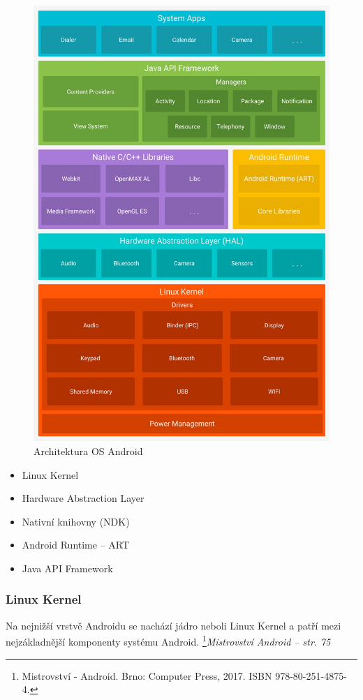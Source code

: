 \documentclass{vskpou} %
\begin{document}
\begin{figure}[h!]
\centering
\includegraphics[scale=0.5]{images/2.jpg}
\caption{Architektura OS Android}
\label{1}
\end{figure}

\begin{itemize}
    \item Linux Kernel
    \item Hardware Abstraction Layer
    \item Nativní knihovny (NDK)
    \item Android Runtime – ART
    \item Java API Framework
\end{itemize}
\newpage
\subsubsection{Linux Kernel}
Na nejnižší vrstvě Androidu se nachází jádro neboli Linux Kernel a patří mezi nejzákladnější komponenty systému Android. \footnote{Mistrovství - Android. Brno: Computer Press, 2017. ISBN 978-80-251-4875-4.}\textit{Mistrovství Android -- str. 75}\cite{10}
\end{document}
